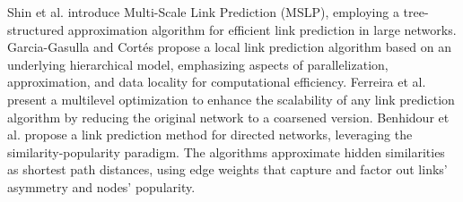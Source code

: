 Shin et al. \cite{shin2012multi} introduce Multi-Scale Link Prediction (MSLP), employing a tree-structured approximation algorithm for efficient link prediction in large networks. Garcia-Gasulla and Cort{\'e}s \cite{garcia2014link} propose a local link prediction algorithm based on an underlying hierarchical model, emphasizing aspects of parallelization, approximation, and data locality for computational efficiency. Ferreira et al. \cite{ferreira2019scalability} present a multilevel optimization to enhance the scalability of any link prediction algorithm by reducing the original network to a coarsened version. Benhidour et al. \cite{benhidour2022approach} propose a link prediction method for directed networks, leveraging the similarity-popularity paradigm. The algorithms approximate hidden similarities as shortest path distances, using edge weights that capture and factor out links' asymmetry and nodes' popularity.

